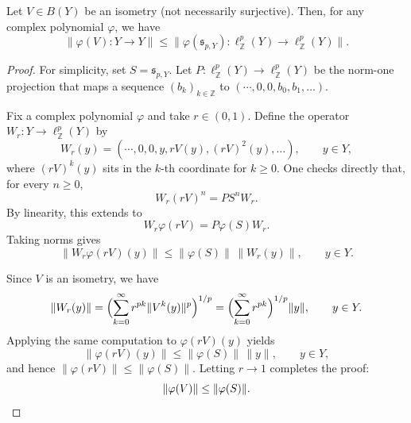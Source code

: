 \documentclass[10pt,a4paper]{amsart}
\begin{document}
\begin{lemma}\label{6Transfer}
Let $V\in B(Y)$ be an isometry (not necessarily surjective). 
Then, for any complex polynomial $\varphi$, we have
$$
\|\varphi(V)\colon Y \longrightarrow Y\| 
\leq \|\varphi({\mathfrak s}_{p,Y})\colon 
\ell^p_{\mathbb Z}(Y) \longrightarrow \ell^p_{\mathbb Z}(Y)\|.
$$
\end{lemma}

\begin{proof}
For simplicity, set $S = {\mathfrak s}_{p,Y}$. 
Let $P\colon \ell^p_{\mathbb Z}(Y) \to \ell^p_{\mathbb Z}(Y)$ 
be the norm-one projection that maps a sequence $(b_k)_{k\in\mathbb Z}$ to
$(\cdots, 0, 0, b_0, b_1, \ldots)$.

Fix a complex polynomial $\varphi$ and take $r\in(0,1)$. Define the operator $W_r\colon Y \to \ell^p_{\mathbb Z}(Y)$ by
$$
W_r(y) = (\cdots, 0, 0, y, rV(y), (rV)^2(y), \ldots), \qquad y \in Y,
$$
where $(rV)^k(y)$ sits in the $k$-th coordinate for $k\ge 0$. One checks directly that, for every $n\ge 0$,
$$
W_r (rV)^n = P S^n W_r.
$$
By linearity, this extends to
$$
W_r \varphi(rV) = P \varphi(S) W_r.
$$
Taking norms gives
$$
\|W_r \varphi(rV)(y)\| \le \|\varphi(S)\| \, \|W_r(y)\|, \qquad y \in Y.
$$

Since $V$ is an isometry, we have
$$
\|W_r(y)\| = \Bigl(\sum_{k=0}^\infty r^{pk} \|V^k(y)\|^p\Bigr)^{1/p}
= \Bigl(\sum_{k=0}^\infty r^{pk}\Bigr)^{1/p} \|y\|, \qquad y \in Y.
$$
Applying the same computation to $\varphi(rV)(y)$ yields
$$
\|\varphi(rV)(y)\| \le \|\varphi(S)\| \, \|y\|, \qquad y \in Y,
$$
and hence $\|\varphi(rV)\| \le \|\varphi(S)\|$. Letting $r \to 1$ completes the proof:
$$
\|\varphi(V)\| \le \|\varphi(S)\|.
\qedhere$$
\end{proof}
\end{document}
